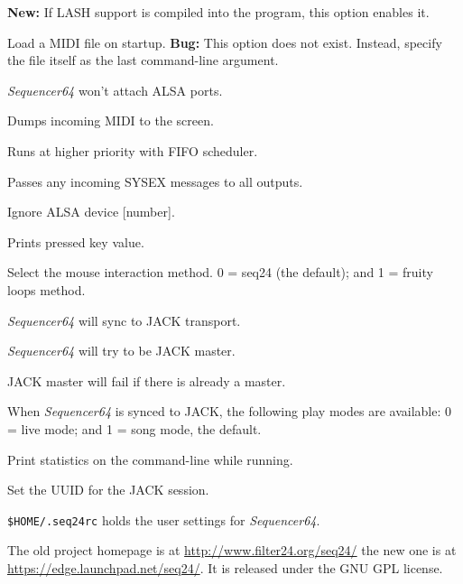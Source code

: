       \textbf{New:}
      If LASH support is compiled into the program, this option
      enables it.

      Load a MIDI file on startup.
      \textbf{Bug:}
      This option does not exist.
      Instead, specify the file itself as the last command-line argument.

      \textsl{Sequencer64} won't attach ALSA ports.

      Dumps incoming MIDI to the screen.

      Runs at higher priority with FIFO scheduler.

      Passes any incoming SYSEX messages to all outputs.

      Ignore ALSA device [number].

      Prints pressed key value.

      Select the mouse interaction method.
      0 = seq24 (the default); and 1 = fruity loops method.

      \textsl{Sequencer64} will sync to JACK transport.

      \textsl{Sequencer64} will try to be JACK master.

      JACK master will fail if there is already a master.

      When \textsl{Sequencer64} is synced to JACK, the following play modes
      are available: 0 = live mode; and 1 = song mode, the default.

      Print statistics on the command-line while running.

      Set the UUID for the JACK session.

   \texttt{\$HOME/.seq24rc} holds the user settings for \textsl{Sequencer64}.

   The old project homepage is at
   \url{http://www.filter24.org/seq24/} the new
   one is at \url{https://edge.launchpad.net/seq24/}.
   It is released under the GNU GPL license.


